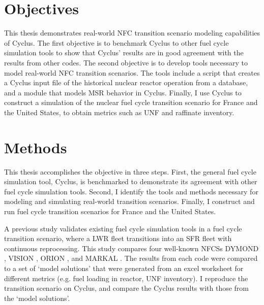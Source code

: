 \section{Objectives}

This thesis demonstrates real-world \gls{NFC} transition
scenario modeling capabilities of Cyclus. The first objective is
to benchmark Cyclus to other fuel cycle simulation tools to
show that Cyclus' results are in good agreement with the results
from other codes. The second objective is to develop tools
necessary to model real-world \gls{NFC} transition
scenarios. The tools include a script that creates a Cyclus
input file of the historical nuclear reactor operation from
a database, and a module that models \gls{MSR} behavior in Cyclus.
Finally, I use Cyclus to construct a simulation of the nuclear
fuel cycle transition scenario for France and the United States,
to obtain metrics such as \gls{UNF} and raffinate inventory.


\section{Methods}
This thesis accomplishes the objective in three steps. First,
the general fuel cycle simulation tool, Cyclus, is benchmarked
to demonstrate its agreement with other fuel cycle simulation
tools. Second, I identify the tools and methods necessary
for modeling and simulating real-world transition scenarios.
Finally, I construct and run fuel cycle transition scenarios
for France and the United States.

A previous study \cite{feng_standardized_2016} validates existing fuel cycle
simulation tools in a fuel cycle transition scenario, where a \gls{LWR} fleet
transitions into an \gls{SFR} fleet with continuous reprocessing. This 
study compares four well-known \glspl{NFCS}
DYMOND \cite{yacout_modeling_2005},
VISION \cite{jacobson_verifiable_2010},
ORION \cite{gregg_analysis_2012}, and
MARKAL \cite{shay_epa_2006}. The results from each code were
compared to a set of `model solutions' that were generated
from an excel worksheet for different metrics (e.g. fuel loading
in reactor, \gls{UNF} inventory). I reproduce the transition
scenario on Cyclus, and compare the Cyclus results with those
from the `model solutions'.


